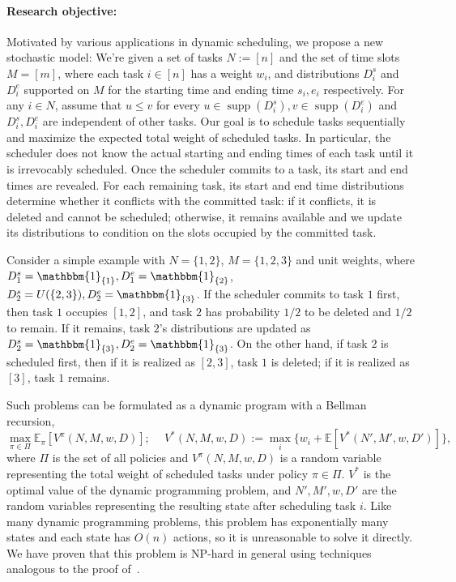 \documentclass{article}
\newcommand{\E}{\mathbb{E}}
\DeclareMathOperator{\supp}{supp}
\begin{document}
\paragraph{\textbf{Research objective:}} Motivated by various applications in dynamic scheduling, we propose a new stochastic model:
We're given a set of tasks $N:=[n]$ and the set of time slots $M=[m]$, where each task $i\in[n]$ has a weight $w_i$, and distributions $D^s_i$ and $D^e_i$ supported on $M$ for the starting time and ending time $s_i,e_i$ respectively.
For any $i\in N$, assume that $u\leq v$ for every $u\in\supp(D^s_i),v\in\supp(D^e_i)$ and $D^s_i,D^e_i$ are independent of other tasks.
Our goal is to schedule tasks sequentially and maximize the expected total weight of scheduled tasks.
In particular, the scheduler does not know the actual starting and ending times of each task until it is irrevocably scheduled.
Once the scheduler commits to a task, its start and end times are revealed. 
For each remaining task, its start and end time distributions determine whether it conflicts with the committed task: if it conflicts, it is deleted and cannot be scheduled; otherwise, it remains available and we update its distributions to condition on the slots occupied by the committed task. 

Consider a simple example with $N=\{1,2\}$, $M=\{1,2,3\}$ and unit weights, where $D_1^s=\mathbbm{1}_{\{1\}},D_1^e=\mathbbm{1}_{\{2\}}$, $D_2^s=U(\{2,3\}),D_2^e=\mathbbm{1}_{\{3\}}$.
If the scheduler commits to task $1$ first, then task $1$ occupies $[1,2]$, and task $2$ has probability $1/2$ to be deleted and $1/2$ to remain.
If it remains, task $2$'s distributions are updated as $D_2^s=\mathbbm{1}_{\{3\}},D_2^e=\mathbbm{1}_{\{3\}}$.
On the other hand, if task $2$ is scheduled first, then if it is realized as $[2,3]$, task $1$ is deleted; if it is realized as $[3]$, task $1$ remains.

Such problems can be formulated as a dynamic program with a Bellman recursion,
\[\max_{\pi\in \Pi}\E_\pi\left[V^\pi(N,M,w,D)\right];\quad~ V^*(N,M,w,D):=\max_i\{w_i+\E[V^*(N',M',w,D')]\},\]
where $\Pi$ is the set of all policies and $V^\pi(N,M,w,D)$ is a random variable representing the total weight of scheduled tasks under policy $\pi\in\Pi$.
$V^*$ is the optimal value of the dynamic programming problem, and $N',M',w,D'$ are the random variables representing the resulting state after scheduling task $i$.
Like many dynamic programming problems, this problem has exponentially many states and each state has $O(n)$ actions, so it is unreasonable to solve it directly.
We have proven that this problem is NP-hard in general using techniques analogous to the proof of~\cite[Theorem 3.2]{DNP}.
\end{document}
